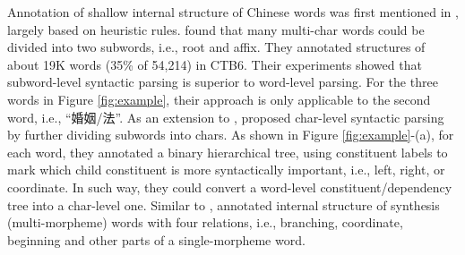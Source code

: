 Annotation of shallow internal structure of Chinese words was first mentioned in \citet{zhao-2009}, largely based on heuristic rules. 
\citet{li-2011,li-zhou-2012} found that many multi-char words could be divided into two subwords, i.e., root and affix. They annotated structures of about 19K words (35\% of 54,214) in CTB6. Their experiments showed that subword-level syntactic parsing is superior to word-level parsing. 
For the three words in Figure \ref{fig:example}, their approach is only applicable to the second word, i.e., ``婚姻/法''.
As an extension to \citet{li-zhou-2012}, \citet{zhang-etal-2013-char, zhang-etal-2014-char} proposed char-level syntactic parsing by further dividing  subwords into chars. 
As shown in Figure \ref{fig:example}-(a), for each word, they annotated a binary hierarchical tree, using  constituent labels to mark which child constituent is more syntactically important, i.e., left, right, or coordinate. 
In such way, they could convert a word-level constituent/dependency tree into a char-level one.
Similar to \citet{li-zhou-2012}, \citet{cheng2014parsing} annotated internal structure of synthesis (multi-morpheme) words with four relations, i.e., branching,
coordinate, beginning and other parts of a single-morpheme word.





